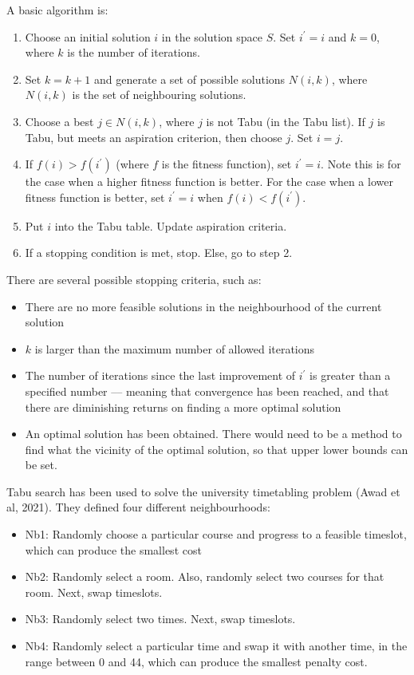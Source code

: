 \documentclass[a4paper, 12pt]{report}
\begin{document}
A basic algorithm is:
\begin{enumerate}
	\item Choose an initial solution \( i \) in the solution space \( S \).
		Set \( i^\prime=i \) and \( k = 0 \), where \( k \) is the number of
		iterations.
	\item Set \( k = k + 1 \) and generate a set of possible solutions
		\( N(i,k) \), where \( N(i,k) \) is the set of neighbouring solutions.
	\item Choose a best \( j \in N(i,k) \), where \( j \) is not Tabu (in the
		Tabu list).
		If \( j \) is Tabu, but meets an aspiration criterion, then choose
		\( j \).
		Set \( i = j \).
	\item If \( f(i) > f(i^\prime) \) (where \( f \) is the fitness function),
		set \( i^\prime = i \).
		Note this is for the case when a higher fitness function is better.
		For the case when a lower fitness function is better, set
		\( i^\prime = i \) when \( f(i) < f(i^\prime) \).
	\item Put \( i \) into the Tabu table. Update aspiration criteria.
	\item If a stopping condition is met, stop. Else, go to step 2.
\end{enumerate}
There are several possible stopping criteria, such as:
\begin{itemize}
	\item There are no more feasible solutions in the neighbourhood of the
		current solution
	\item \( k \) is larger than the maximum number of allowed iterations
	\item The number of iterations since the last improvement of \( i^\prime \)
		is greater than a specified number –-- meaning that convergence has been
		reached, and that there are diminishing returns on finding a more
		optimal solution
	\item An optimal solution has been obtained.
		There would need to be a method to find what the vicinity of the optimal
		solution, so that upper lower bounds can be set.
\end{itemize}
Tabu search has been used to solve the university timetabling problem (Awad et
al, 2021). They defined four different neighbourhoods:
\begin{itemize}
	\item Nb1: Randomly choose a particular course and progress to a feasible
		timeslot, which can produce the smallest cost
	\item Nb2: Randomly select a room. Also, randomly select two courses for
		that room. Next, swap timeslots.
	\item Nb3: Randomly select two times. Next, swap timeslots.
	\item Nb4: Randomly select a particular time and swap it with another time,
		in the range between 0 and 44, which can produce the smallest penalty
		cost.
\end{itemize}
\end{document}
